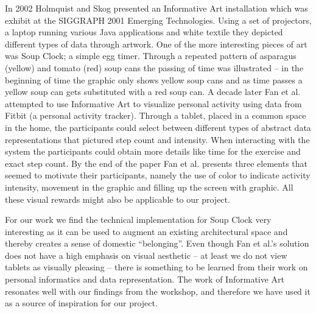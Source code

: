 In 2002 Holmquist and Skog \cite{holmquist2003informative} presented an Informative Art installation which was exhibit at the SIGGRAPH 2001 Emerging Technologies. Using a set of projectors, a laptop running various Java applications and white textile they depicted different types of data through artwork. One of the more interesting pieces of art was Soup Clock; a simple egg timer. Through a repeated pattern of asparagus (yellow) and tomato (red) soup cans the passing of time was illustrated -- in the beginning of time the graphic only shows yellow soup cans and as time passes a yellow soup can gets substituted with a red soup can. A decade later Fan et al. \cite{fan2012spark} attempted to use Informative Art to visualize personal activity using data from Fitbit (a personal activity tracker). Through a tablet, placed in a common space in the home, the participants could select between different types of abstract data representations that pictured step count and intensity. When interacting with the system the participants could obtain more details like time for the exercise and exact step count. By the end of the paper Fan et al. presents three elements that seemed to motivate their participants, namely the use of color to indicate activity intensity, movement in the graphic and filling up the screen with graphic. All these visual rewards might also be applicable to our project.

For our work we find the technical implementation for Soup Clock very interesting as it can be used to augment an existing architectural space and thereby creates a sense of domestic “belonging”. Even though Fan et al.’s solution does not have a high emphasis on visual aesthetic -- at least we do not view tablets as visually pleasing -- there is something to be learned from their work on personal informatics and data representation. The work of Informative Art resonates well with our findings from the workshop, and therefore we have used it as a source of inspiration for our project.

